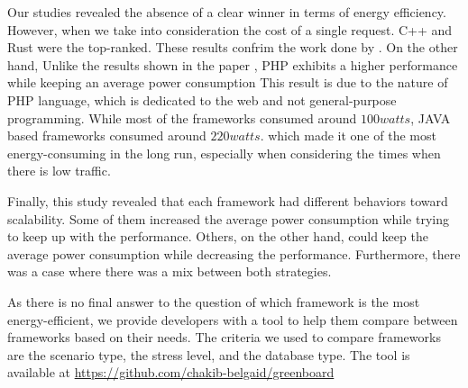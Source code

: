 Our studies revealed the absence of a clear winner in terms of energy efficiency. However, when we take into consideration the cost of a single request. C++ and Rust were the top-ranked. These results confrim the work done by \citeauthor{pereira_energy_2017}. On the other hand, Unlike the results shown in the paper \cite{pereira_energy_2017}, \textsf{PHP} exhibits a higher performance while keeping an average power consumption 
This result is due to the nature of \textsf{PHP} language, which is dedicated to the web and not general-purpose programming. 
While most of the frameworks consumed around $100 watts$, \textsf{JAVA} based frameworks consumed around $220 watts$. which made it one of the most energy-consuming in the long run, especially when considering the times when there is low traffic.  

Finally, this study revealed that each framework had different behaviors toward scalability. Some of them increased the average power consumption while trying to keep up with the performance. Others, on the other hand, could keep the average power consumption while decreasing the performance. Furthermore, there was a case where there was a mix between both strategies. 

As there is no final answer to the question of which framework is the most energy-efficient, we provide developers with a tool to help them compare between frameworks based on their needs. The criteria we used to compare frameworks are the scenario type, the stress level, and the database type. The tool is available at \url{https://github.com/chakib-belgaid/greenboard}
